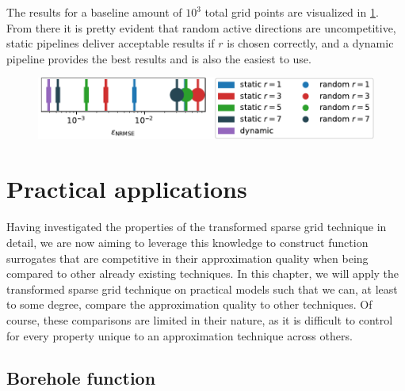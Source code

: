 \documentclass[
  a4paper,  %
  twoside,  %
  bibliography=totoc,
  headsepline,
  cleardoublepage=empty,
  parskip=half,
  draft=false
]{scrbook}
\begin{document}
The results for a baseline amount of $10^3$ total grid points are visualized in \cref{fig:ww_comp}.
From there it is pretty evident that random active directions are uncompetitive, static pipelines deliver acceptable results if $r$ is chosen correctly, and a dynamic pipeline provides the best results and is also the easiest to use.

\begin{mdframed}[style=style]
\begin{figure}[H]
\vspace{-2mm}
\includegraphics[width=\textwidth]{graphics/ww_compare}\vspace{-1mm}
\delimit
{}
\label{fig:ww_comp}
\end{figure}
\end{mdframed}


\chapter{Practical applications}
\label{chap:c8}

Having investigated the properties of the transformed sparse grid technique in detail, we are now aiming to leverage this knowledge to construct function surrogates that are competitive in their approximation quality when being compared to other already existing techniques.
In this chapter, we will apply the transformed sparse grid technique on practical models such that we can, at least to some degree, compare the approximation quality to other techniques.
Of course, these comparisons are limited in their nature, as it is difficult to control for every property unique to an approximation technique across others.

\section{Borehole function}
\end{document}
